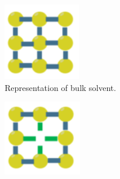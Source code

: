 \begin{figure}[h]
    \centering
    \begin{subfigure}[t]{0.25\textwidth}
    \includegraphics[width=\textwidth]{Figures/Chapter 4/Cavity_1.png}
    \caption{Representation of bulk solvent.}
    \label{fig:solv_1}
    \end{subfigure}
    \hspace{0.5cm}
    \begin{subfigure}[t]{0.25\textwidth}
    \includegraphics[width=\textwidth]{Figures/Chapter 4/Cavity_2.png}

\end{subfigure}
\end{figure}
